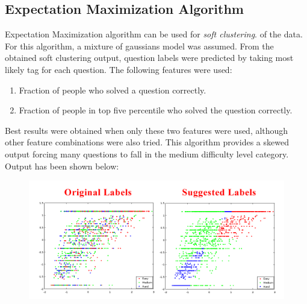 \documentclass[12pt]{article}
\begin{document}
	
	\newpage
	\subsection{Expectation Maximization Algorithm}
	Expectation Maximization algorithm can be used for \textit{soft clustering}.
	of the data. For this algorithm, a mixture of gaussians model was assumed.
	From the obtained soft clustering output, question labels were predicted
	by taking most likely tag for each question. The following features were used:
	\begin{enumerate}
	\item Fraction of people who solved a question correctly.
	\item Fraction of people in top five percentile who solved the question
	correctly.
	\end{enumerate}
	
	Best results were obtained when only these two features were used, 
	although other feature combinations were also tried. This algorithm provides
	a skewed output forcing many questions to fall in the medium difficulty
	level category. Output has been shown below:
	\begin{figure}[h]
	\includegraphics[width=\textwidth]{EMOutput}
	\end{figure}
	
\end{document}
